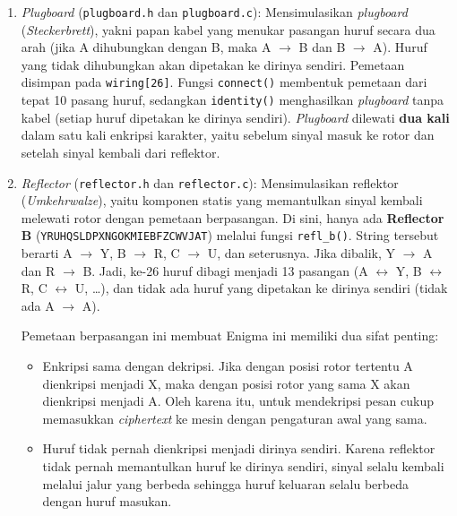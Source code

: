 \begin{enumerate}
  \item \textit{Plugboard} (\texttt{plugboard.h} dan \texttt{plugboard.c}): Mensimulasikan \textit{plugboard}
  (\textit{Steckerbrett}), yakni papan kabel yang menukar pasangan huruf secara dua arah (jika A dihubungkan
  dengan B, maka A $\to$ B dan B $\to$ A). Huruf yang tidak dihubungkan akan dipetakan ke dirinya sendiri.
  Pemetaan disimpan pada \texttt{wiring[26]}. Fungsi \texttt{connect()} membentuk pemetaan dari tepat
  10 pasang huruf, sedangkan \texttt{identity()} menghasilkan \textit{plugboard} tanpa kabel (setiap huruf
  dipetakan ke dirinya sendiri). \textit{Plugboard} dilewati \textbf{dua kali} dalam satu kali enkripsi
  karakter, yaitu sebelum sinyal masuk ke rotor dan setelah sinyal kembali dari reflektor.

  \item \textit{Reflector} (\texttt{reflector.h} dan \texttt{reflector.c}): Mensimulasikan reflektor
  (\textit{Umkehrwalze}), yaitu komponen statis yang memantulkan sinyal kembali melewati rotor dengan
  pemetaan berpasangan. Di sini, hanya ada \textbf{Reflector B} (\texttt{YRUHQSLDPXNGOKMIEBFZCWVJAT})
  melalui fungsi \texttt{refl\_b()}. String tersebut berarti A $\to$ Y, B $\to$ R, C $\to$ U, dan
  seterusnya. Jika dibalik, Y $\to$ A dan R $\to$ B. Jadi, ke-26 huruf dibagi menjadi 13 pasangan
  (A $\leftrightarrow$ Y, B $\leftrightarrow$ R, C $\leftrightarrow$ U, \dots), dan tidak ada huruf yang
  dipetakan ke dirinya sendiri (tidak ada A $\to$ A).

  Pemetaan berpasangan ini membuat Enigma ini memiliki dua sifat penting:
  \begin{itemize}[nosep]
    \item Enkripsi sama dengan dekripsi. Jika dengan posisi rotor tertentu A dienkripsi menjadi
    X, maka dengan posisi rotor yang sama X akan dienkripsi menjadi A. Oleh karena itu, untuk mendekripsi
    pesan cukup memasukkan \textit{ciphertext} ke mesin dengan pengaturan awal yang sama.
    \item Huruf tidak pernah dienkripsi menjadi dirinya sendiri. Karena reflektor tidak pernah
    memantulkan huruf ke dirinya sendiri, sinyal selalu kembali melalui jalur yang berbeda sehingga huruf
    keluaran selalu berbeda dengan huruf masukan.
  \end{itemize}


\end{enumerate}
